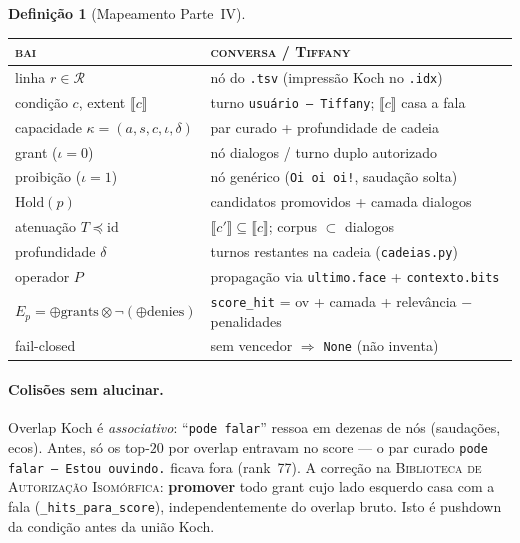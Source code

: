\documentclass[11pt]{article}
\newcommand{\Tiffany}{\textsc{Tiffany}}
\newcommand{\BAI}{\textsc{Biblioteca de Autorização Isomórfica}}
\theoremstyle{definition}
\newtheorem{definition}[theorem]{Definição}
\newcommand{\R}{\mathcal{R}}
\newcommand{\ext}[1]{\llbracket #1 \rrbracket}
\newcommand{\dep}{\delta}
\begin{document}
  \begin{definition}[Mapeamento Parte~IV]\label{def:tiffany-casl}
  \begin{center}
  \small
  \renewcommand{\arraystretch}{1.25}
  \begin{tabular}{@{}l@{\quad}l@{}}
    \toprule
    \textsc{bai} & \textsc{conversa / \Tiffany} \\
    \midrule
    linha $r\in\R$ & nó do \texttt{.tsv} (impressão Koch no \texttt{.idx}) \\
    condição $c$, extent $\ext{c}$ & turno \texttt{usuário — Tiffany}; $\ext{c}$ casa a fala \\
    capacidade $\kappa=(a,s,c,\iota,\dep)$ & par curado + profundidade de cadeia \\
    grant ($\iota=0$) & nó dialogos / turno duplo autorizado \\
    proibição ($\iota=1$) & nó genérico (\texttt{Oi oi oi!}, saudação solta) \\
    $\mathrm{Hold}(p)$ & candidatos promovidos + camada dialogos \\
    atenuação $T\preceq\mathrm{id}$ & $\ext{c'}\subseteq\ext{c}$; corpus $\subset$ dialogos \\
    profundidade $\dep$ & turnos restantes na cadeia (\texttt{cadeias.py}) \\
    operador $P$ & propagação via \texttt{ultimo.face} + \texttt{contexto.bits} \\
    $E_p=\oplus\text{grants}\otimes\neg(\oplus\text{denies})$ & \texttt{score\_hit} = ov + camada + relevância $-$ penalidades \\
    fail-closed & sem vencedor $\Rightarrow$ \texttt{None} (não inventa) \\
    \bottomrule
  \end{tabular}
  \end{center}
  \end{definition}

  \paragraph{Colisões sem alucinar.}
  Overlap Koch é \emph{associativo}: ``\texttt{pode falar}'' ressoa em dezenas de
  nós (saudações, ecos). Antes, só os top-$20$ por overlap entravam no score ---
  o par curado \texttt{pode falar — Estou ouvindo.} ficava fora (rank~77). A
  correção na \BAI: \textbf{promover} todo grant cujo lado esquerdo casa com a fala
  (\texttt{\_hits\_para\_score}), independentemente do overlap bruto. Isto é
  pushdown da condição antes da união Koch.
\end{document}
